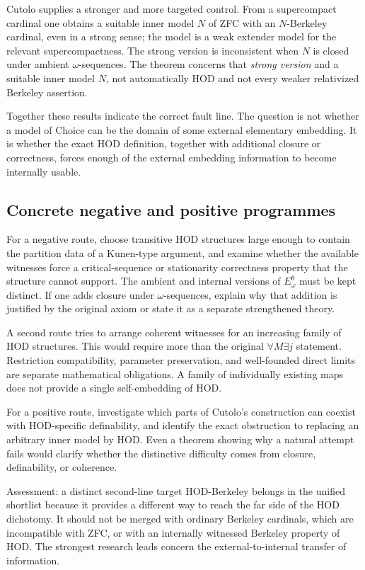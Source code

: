 \documentclass[11pt,letterpaper]{article}
\theoremstyle{definition}
\begin{document}
Cutolo supplies a stronger and more targeted control. From a supercompact cardinal one obtains a suitable inner model $N$ of ZFC with an $N$-Berkeley cardinal, even in a strong sense; the model is a weak extender model for the relevant supercompactness. The strong version is inconsistent when $N$ is closed under ambient $\omega$-sequences. The theorem concerns that \emph{strong version} and a suitable inner model $N$, not automatically HOD and not every weaker relativized Berkeley assertion. \cite{cutolo}

Together these results indicate the correct fault line. The question is not whether a model of Choice can be the domain of some external elementary embedding. It is whether the exact HOD definition, together with additional closure or correctness, forces enough of the external embedding information to become internally usable.

\subsection{Concrete negative and positive programmes}

For a negative route, choose transitive HOD structures large enough to contain the partition data of a Kunen-type argument, and examine whether the available witnesses force a critical-sequence or stationarity correctness property that the structure cannot support. The ambient and internal versions of $E^\theta_\omega$ must be kept distinct. If one adds closure under $\omega$-sequences, explain why that addition is justified by the original axiom or state it as a separate strengthened theory.

A second route tries to arrange coherent witnesses for an increasing family of HOD structures. This would require more than the original $\forall M\exists j$ statement. Restriction compatibility, parameter preservation, and well-founded direct limits are separate mathematical obligations. A family of individually existing maps does not provide a single self-embedding of HOD.

For a positive route, investigate which parts of Cutolo's construction can coexist with HOD-specific definability, and identify the exact obstruction to replacing an arbitrary inner model by HOD. Even a theorem showing why a natural attempt fails would clarify whether the distinctive difficulty comes from closure, definability, or coherence.

\begin{assessment}{Assessment: a distinct second-line target}
HOD-Berkeley belongs in the unified shortlist because it provides a different way to reach the far side of the HOD dichotomy. It should not be merged with ordinary Berkeley cardinals, which are incompatible with ZFC, or with an internally witnessed Berkeley property of HOD. The strongest research leads concern the external-to-internal transfer of information.
\end{assessment}
\end{document}
